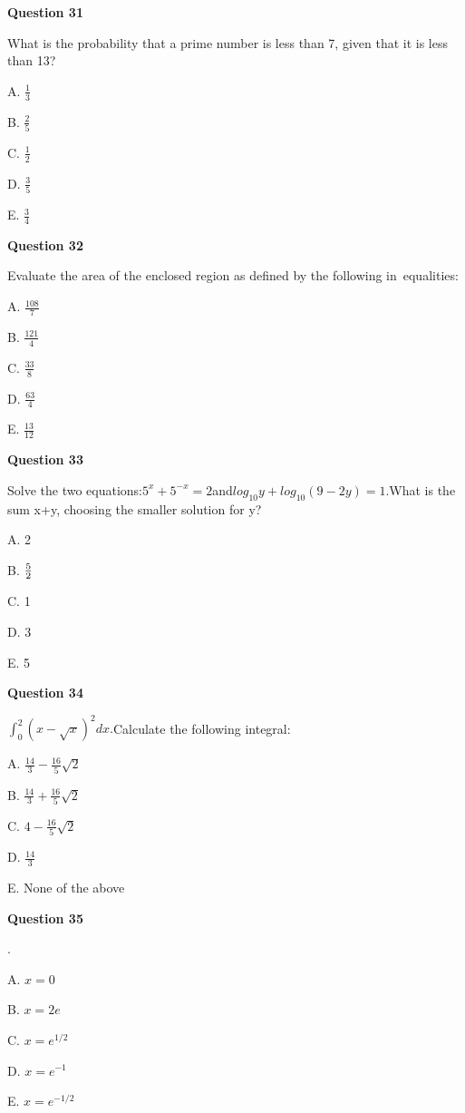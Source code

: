 \textbf{Question 31}

What is the probability that a prime number is less than 7, given that it is less than 13?

A. \(\frac{1}{3}\)

B. \(\frac{2}{5}\)

C. \(\frac{1}{2}\)

D. \(\frac{3}{5}\)

E. \(\frac{3}{4}\)


\textbf{Question 32}

Evaluate the area of the enclosed region as defined by the following in equalities:

A. \(\frac{108}{7}\)

B. \(\frac{121}{4}\)

C. \(\frac{33}{8}\)

D. \(\frac{63}{4}\)

E. \(\frac{13}{12}\)


\textbf{Question 33}

Solve the two equations:\(5^x+5^{-x}=2 \)and\({log}_{10}y+{log}_{10}\left(9-2y\right)=1.\)What is the sum x+y, choosing the smaller solution for y?

A. 2

B. \(5\over2\)

C. 1

D. 3

E. 5


\textbf{Question 34}

\(\int_{0}^{2}{{(x-\sqrt x)}^2dx}.\)Calculate the following integral:

A. \(\frac{14}{3}-\frac{16}{5}\sqrt2\)

B. \(\frac{14}{3}+\frac{16}{5}\sqrt2\)

C. \(4-\frac{16}{5}\sqrt2\)

D. \(\frac{14}{3}\)

E. None of the above


\textbf{Question 35}

.

A. \(x=0\)

B. \(x=2e\)

C. \(x=e^{1/2}\)

D. \(x=e^{-1}\)

E. \(x=e^{-1/2}\)


